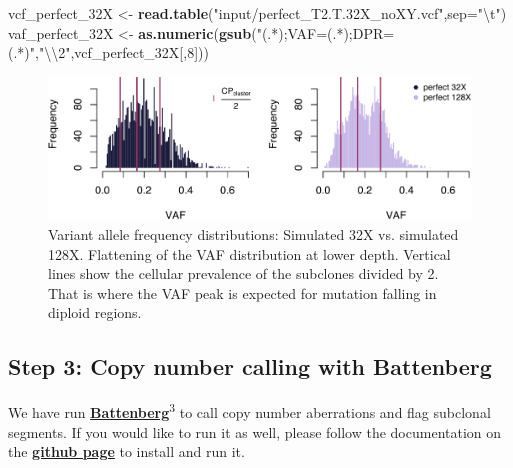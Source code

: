 \documentclass[]{article}
\newenvironment{Shaded}{\begin{snugshade}}{\end{snugshade}}
\newcommand{\CharTok}[1]{\textcolor[rgb]{0.31,0.60,0.02}{#1}}
\newcommand{\DataTypeTok}[1]{\textcolor[rgb]{0.13,0.29,0.53}{#1}}
\newcommand{\DecValTok}[1]{\textcolor[rgb]{0.00,0.00,0.81}{#1}}
\newcommand{\KeywordTok}[1]{\textcolor[rgb]{0.13,0.29,0.53}{\textbf{#1}}}
\newcommand{\NormalTok}[1]{#1}
\newcommand{\StringTok}[1]{\textcolor[rgb]{0.31,0.60,0.02}{#1}}
\begin{document}
\begin{Shaded}
\begin{Highlighting}[]
\NormalTok{vcf_perfect_32X <-}\StringTok{ }\KeywordTok{read.table}\NormalTok{(}\StringTok{"input/perfect_T2.T.32X_noXY.vcf"}\NormalTok{,}\DataTypeTok{sep=}\StringTok{"}\CharTok{\textbackslash{}t}\StringTok{"}\NormalTok{)}
\NormalTok{vaf_perfect_32X <-}\StringTok{ }\KeywordTok{as.numeric}\NormalTok{(}\KeywordTok{gsub}\NormalTok{(}\StringTok{"(.*);VAF=(.*);DPR=(.*)"}\NormalTok{,}\StringTok{"}\CharTok{\textbackslash{}\textbackslash{}}\StringTok{2"}\NormalTok{,vcf_perfect_32X[,}\DecValTok{8}\NormalTok{]))}
\end{Highlighting}
\end{Shaded}

\begin{figure}

{\centering \includegraphics{src_guide_files/figure-latex/fig1b-1} 

}

\caption{\label{fig1b}Variant allele frequency distributions: Simulated 32X vs. simulated 128X. Flattening of the VAF distribution at lower depth. Vertical lines show the cellular prevalence of the subclones divided by 2. That is where the VAF peak is expected for mutation falling in diploid regions.}\label{fig:fig1b}
\end{figure}

\newpage

\hypertarget{step-3-copy-number-calling-with-battenberg}{%
\subsection{Step 3: Copy number calling with
Battenberg}\label{step-3-copy-number-calling-with-battenberg}}

We have run
\href{https://github.com/Wedge-Oxford/battenberg}{\textbf{Battenberg}}\textsuperscript{3}
to call copy number aberrations and flag subclonal segments. If you
would like to run it as well, please follow the documentation on the
\href{https://github.com/Wedge-Oxford/battenberg}{\textbf{github page}}
to install and run it.
\end{document}
